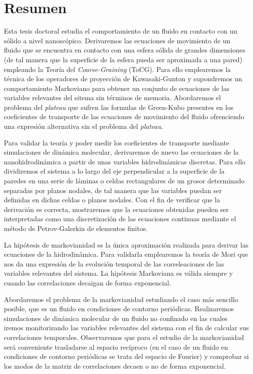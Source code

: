 \documentclass[b5paper,openright,10pt]{book}
\begin{document}
\chapter*{Resumen} %
Esta tesis doctoral estudia el comportamiento de un fluido en contacto con un sólido a nivel nanoscópico. Derivaremos las ecuaciones de movimiento de un fluido que se encuentra en contacto con una esfera sólida de grandes dimensiones (de tal manera que la superficie de la esfera pueda ser aproximada a una pared) empleando la Teoría del \textit{Coarse-Graining} (ToCG). Para ello emplearemos la técnica de los operadores de proyección de Kawasaki-Gunton y supondremos un comportamiento Markoviano para obtener un conjunto de ecuaciones de las variables relevantes del sitema sin términos de memoria. 
Abordaremos el problema del \textit{plateau} que sufren las formulas de Green-Kubo presentes en los coeficientes de transporte de las ecuaciones de movimiento del fluido ofrenciendo una expresión alternativa sin el problema del \textit{plateau}.  

Para validar la teoría y poder medir los coeficientes de transporte mediante simulaciones de dinámica molecular, derivaremos de nuevo las ecuaciones de la nanohidrodinámica a partir de unas variables hidrodinámicas discretas. 
Para ello dividiremos el sistema a lo largo del eje perpendicular a la superficie de la paredes en una serie de láminas o celdas rectangulares de un grosor determinado separadas por planos nodales, de tal manera que las variables puedan ser definidas en dichas celdas o planos nodales.  
Con el fin de verificar que la derivación es correcta, mostraremos que la ecuaciones obtenidas pueden ser interpretadas como una discretización de las ecuaciones continuas mediante el método de Petrov-Galerkin de elementos finitos.  

La hipótesis de markovianidad es la única aproximación realizada para derivar las ecuaciones de la hidrodinámica. Para validarla emplearemos la teoría de Mori que nos da una expresión de la evolución temporal de las correleaciones de las variables relevantes del sistema. La hipótesis Markoviana es válida siempre y cuando las correlaciones decaigan de forma exponencial.

Abordaremos el problema de la markovianidad estudiando el caso más sencillo posible, que es un fluido en condiciones de contorno periódicas. Realizaremos simulaciones de dinámica molecular de un fluido no confinado en las cuales iremos monitorizando las variables relevantes del sistema con el fin de calcular sus correlaciones temporales. 
Observaremos que para el estudio de la markovianidad será conveniente trasladarse al espacio recíproco (en el caso de un fluido en condiciones de contorno periódicas se trata del espacio de Fourier) y comprobar si los modos de la matriz de correlaciones decaen o no de forma exponencial. 
\end{document}
